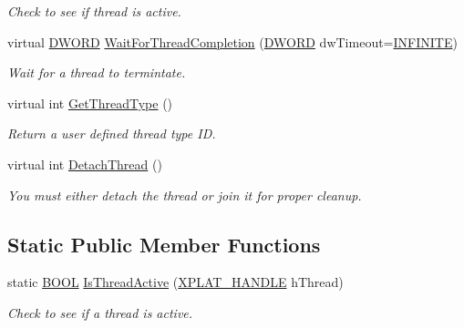 \begin{DoxyCompactItemize}
\begin{DoxyCompactList}\small\item\em \-Check to see if thread is active. \end{DoxyCompactList}\item 
virtual \hyperlink{_x_plat_8h_aa39b39d94407451a6ec0226479db68cf}{\-D\-W\-O\-R\-D} \hyperlink{class_c_x_plat_thread_ab68b6494893d24b365e317bff78b3a9e}{\-Wait\-For\-Thread\-Completion} (\hyperlink{_x_plat_8h_aa39b39d94407451a6ec0226479db68cf}{\-D\-W\-O\-R\-D} dw\-Timeout=\hyperlink{_x_plat_8h_aa84a29002ab81c719c0d07bb446296e0}{\-I\-N\-F\-I\-N\-I\-T\-E})
\begin{DoxyCompactList}\small\item\em \-Wait for a thread to termintate. \end{DoxyCompactList}\item 
virtual int \hyperlink{class_c_x_plat_thread_a1ed5f6517c305e9cfa981a60a0d191e7}{\-Get\-Thread\-Type} ()
\begin{DoxyCompactList}\small\item\em \-Return a user defined thread type \-I\-D. \end{DoxyCompactList}\item 
virtual int \hyperlink{class_c_x_plat_thread_ae85703ff3ca0b8516f1a0e75bd937667}{\-Detach\-Thread} ()
\begin{DoxyCompactList}\small\item\em \-You must either detach the thread or join it for proper cleanup. \end{DoxyCompactList}\end{DoxyCompactItemize}
\subsection*{\-Static \-Public \-Member \-Functions}
\begin{DoxyCompactItemize}
\item 
static \hyperlink{_cpclient_8h_a3be13892ae7076009afcf121347dd319}{\-B\-O\-O\-L} \hyperlink{class_c_x_plat_thread_aeb38ce2a0b264d0da5c3c5d26460f851}{\-Is\-Thread\-Active} (\hyperlink{_x_plat_8h_af3c5c1485bb09f4be888d78cdaf93e00}{\-X\-P\-L\-A\-T\-\_\-\-H\-A\-N\-D\-L\-E} h\-Thread)
\begin{DoxyCompactList}\small\item\em \-Check to see if a thread is active. \end{DoxyCompactList}\end{DoxyCompactItemize}
